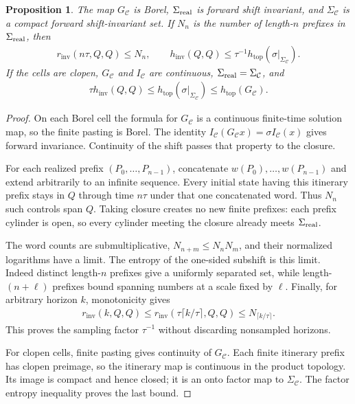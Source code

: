 \documentclass[11pt,a4paper]{article}
\newtheorem{proposition}[theorem]{Proposition}
\theoremstyle{definition}
\theoremstyle{remark}
\begin{document}
\begin{proposition}\label{prop:partition}
The map \(G_{\mathcal C}\) is Borel, \(\Sigma_{\rm real}\) is forward shift invariant, and \(\Sigma_{\mathcal C}\) is a compact forward shift-invariant set. If \(N_n\) is the number of length-\(n\) prefixes in \(\Sigma_{\rm real}\), then
\begin{align*}
 r_{\mathrm{inv}}(n\tau,Q,Q)\leq N_n,\qquad
 h_{\mathrm{inv}}(Q,Q)\leq\tau^{-1}h_{\mathrm{top}}(\sigma|_{\Sigma_{\mathcal C}}).
\end{align*}
If the cells are clopen, \(G_{\mathcal C}\) and \(I_{\mathcal C}\) are continuous, \(\Sigma_{\rm real}=\Sigma_{\mathcal C}\), and
\begin{align*}
 \tau h_{\mathrm{inv}}(Q,Q)\leq
 h_{\mathrm{top}}(\sigma|_{\Sigma_{\mathcal C}})
 \leq h_{\mathrm{top}}(G_{\mathcal C}).
\end{align*}
\end{proposition}
\begin{proof}
On each Borel cell the formula for \(G_{\mathcal C}\) is a continuous finite-time solution map, so the finite pasting is Borel. The identity
\(I_{\mathcal C}(G_{\mathcal C}x)=\sigma I_{\mathcal C}(x)\)
gives forward invariance. Continuity of the shift passes that property to the closure.

For each realized prefix \((P_0,\ldots,P_{n-1})\), concatenate \(w(P_0),\ldots,w(P_{n-1})\) and extend arbitrarily to an infinite sequence. Every initial state having this itinerary prefix stays in \(Q\) through time \(n\tau\) under that one concatenated word. Thus \(N_n\) such controls span \(Q\). Taking closure creates no new finite prefixes: each prefix cylinder is open, so every cylinder meeting the closure already meets \(\Sigma_{\rm real}\).

The word counts are submultiplicative, \(N_{n+m}\leq N_nN_m\), and their normalized logarithms have a limit. The entropy of the one-sided subshift is this limit. Indeed distinct length-\(n\) prefixes give a uniformly separated set, while length-\((n+\ell)\) prefixes bound spanning numbers at a scale fixed by \(\ell\). Finally, for arbitrary horizon \(k\), monotonicity gives
\begin{align*}
 r_{\mathrm{inv}}(k,Q,Q)\leq
 r_{\mathrm{inv}}(\tau\lceil k/\tau\rceil,Q,Q)
 \leq N_{\lceil k/\tau\rceil}.
\end{align*}
This proves the sampling factor \(\tau^{-1}\) without discarding nonsampled horizons.

For clopen cells, finite pasting gives continuity of \(G_{\mathcal C}\). Each finite itinerary prefix has clopen preimage, so the itinerary map is continuous in the product topology. Its image is compact and hence closed; it is an onto factor map to \(\Sigma_{\mathcal C}\). The factor entropy inequality proves the last bound.
\end{proof}
\end{document}
